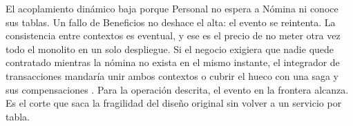 El acoplamiento dinámico baja porque Personal no espera a Nómina ni conoce sus tablas. Un fallo de Beneficios no deshace el alta: el evento se reintenta. La consistencia entre contextos es eventual, y ese es el precio de no meter otra vez todo el monolito en un solo despliegue. Si el negocio exigiera que nadie quede contratado mientras la nómina no exista en el mismo instante, el integrador de transacciones mandaría unir ambos contextos o cubrir el hueco con una saga y sus compensaciones \parencite{ford2021hard}. Para la operación descrita, el evento en la frontera alcanza. Es el corte que saca la fragilidad del diseño original sin volver a un servicio por tabla.
